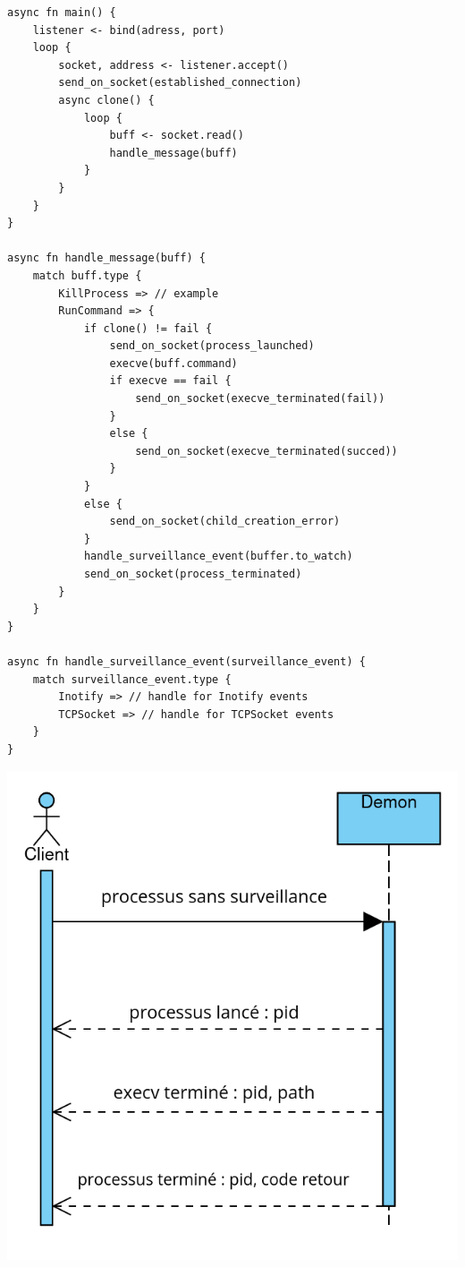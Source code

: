 \documentclass{article}
\begin{document}
\begin{verbatim}
async fn main() {
    listener <- bind(adress, port)
    loop {
        socket, address <- listener.accept()
        send_on_socket(established_connection)
        async clone() {
            loop {
                buff <- socket.read()
                handle_message(buff)
            }
        }
    }
}

async fn handle_message(buff) {
    match buff.type {
        KillProcess => // example
        RunCommand => {
            if clone() != fail {
                send_on_socket(process_launched)
                execve(buff.command)
                if execve == fail {
                    send_on_socket(execve_terminated(fail))
                }
                else {
                    send_on_socket(execve_terminated(succed))
                }
            }
            else {
                send_on_socket(child_creation_error)
            }
            handle_surveillance_event(buffer.to_watch)
            send_on_socket(process_terminated)
        }
    }
}

async fn handle_surveillance_event(surveillance_event) {
    match surveillance_event.type {
        Inotify => // handle for Inotify events
        TCPSocket => // handle for TCPSocket events
    }
}
\end{verbatim}

\centerline{\includegraphics[scale=0.35]{fonctionnement_normal.png}}
\end{document}

